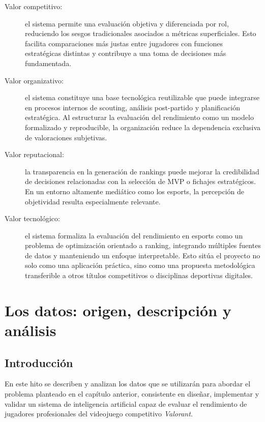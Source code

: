 \documentclass{ULBreport} %
\begin{document}
\begin{description}

    \item[Valor competitivo:] el sistema permite una evaluación objetiva y diferenciada por rol, reduciendo los sesgos tradicionales asociados a métricas superficiales. Esto facilita comparaciones más justas entre jugadores con funciones estratégicas distintas y contribuye a una toma de decisiones más fundamentada.

    \item[Valor organizativo:] el sistema constituye una base tecnológica reutilizable que puede integrarse en procesos internos de scouting, análisis post-partido y planificación estratégica. Al estructurar la evaluación del rendimiento como un modelo formalizado y reproducible, la organización reduce la dependencia exclusiva de valoraciones subjetivas.

    \item[Valor reputacional:] la transparencia en la generación de rankings puede mejorar la credibilidad de decisiones relacionadas con la selección de MVP o fichajes estratégicos. En un entorno altamente mediático como los esports, la percepción de objetividad resulta especialmente relevante.

    \item[Valor tecnológico:] el sistema formaliza la evaluación del rendimiento en esports como un problema de optimización orientado a ranking, integrando múltiples fuentes de datos y manteniendo un enfoque interpretable. Esto sitúa el proyecto no solo como una aplicación práctica, sino como una propuesta metodológica transferible a otros títulos competitivos o disciplinas deportivas digitales.

\end{description}

\chapter{Los datos: origen, descripción y análisis}

\section{Introducción}

En este hito se describen y analizan los datos que se utilizarán para abordar el problema planteado en el capítulo anterior, consistente en diseñar, implementar y validar un sistema de inteligencia artificial capaz de evaluar el rendimiento de jugadores profesionales del videojuego competitivo \textit{Valorant}.
\end{document}
